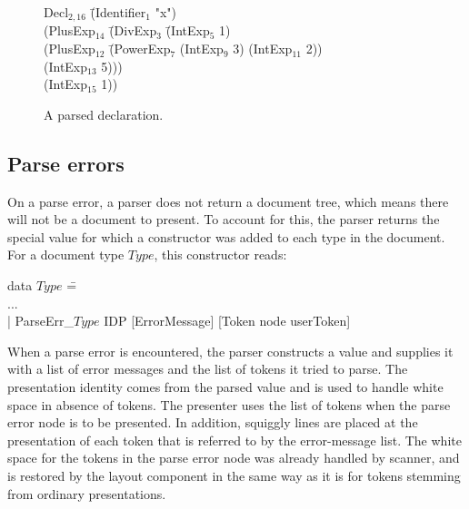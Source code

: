 \documentclass{article}[10pt]
\begin{document}
\begin{figure}
\begin{center}
\begin{footnotesize}
\begin{tabbedCode}
Decl$_{2,16}$ \= (Identifier$_1$ "x")\\ 
              \> (PlusExp$_{14}$ \= (DivExp$_3$ \= (IntExp$_5$ 1) \\
              \>                 \>             \> (PlusExp$_{12}$ \= (PowerExp$_7$ (IntExp$_9$ 3) (IntExp$_{11}$ 2))\\
              \>                 \>             \>                 \> (IntExp$_{13}$ 5)))\\
              \>                 \>(IntExp$_{15}$ 1))
\end{tabbedCode}
\end{footnotesize}
\end{center}
\caption{A parsed declaration.} \label{fig:parseResult} 
\end{figure}

\subsection{Parse errors} \label{sect:parseScanErrors}

On a parse error, a parser does not return a document tree, which means there will not be a document to present. To account for this, the parser returns the special value for which a constructor was added to each type in the document. For a document type $Type$, this constructor reads:

\begin{footnotesize}
\begin{tabbedCode}
data $Type$ \= =\\
            \> ...\\
            \> | ParseErr\_$Type$ IDP [ErrorMessage] [Token node userToken] 
\end{tabbedCode}
\end{footnotesize}

When a parse error is encountered, the parser constructs a  value and supplies it with a list of error messages and the list of tokens it tried to parse. The presentation identity comes from the parsed  value and is used to handle white space in absence of tokens. The presenter uses the list of tokens when the parse error node is to be presented. In addition, squiggly lines are placed at the presentation of each token that is referred to by the error-message list. The white space for the tokens in the parse error node was already handled by scanner, and is restored by the layout component in the same way as it is for tokens stemming from ordinary presentations.
\end{document}
